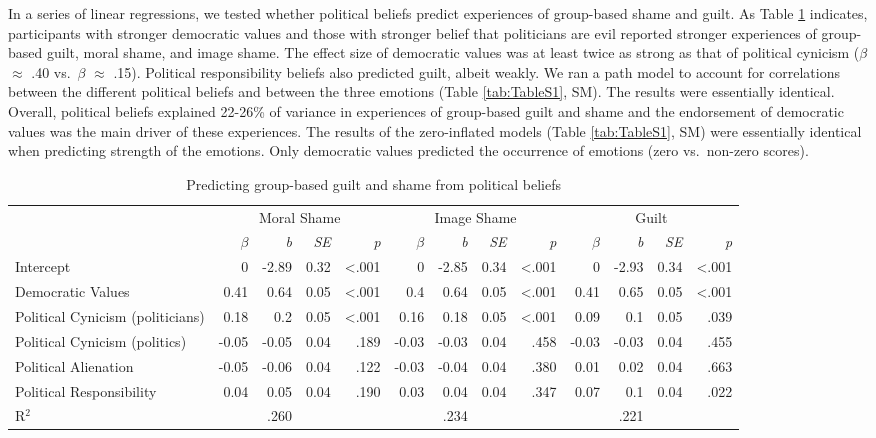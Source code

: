 \documentclass[
]{article}
\begin{document}
In a series of linear regressions, we tested whether political beliefs predict experiences of group-based shame and guilt. As Table \ref{tab:Table1} indicates, participants with stronger democratic values and those with stronger belief that politicians are evil reported stronger experiences of group-based guilt, moral shame, and image shame. The effect size of democratic values was at least twice as strong as that of political cynicism (\(\beta\) \(\approx\) .40 vs.~\(\beta\) \(\approx\) .15). Political responsibility beliefs also predicted guilt, albeit weakly. We ran a path model to account for correlations between the different political beliefs and between the three emotions (Table \ref{tab:TableS1}, SM). The results were essentially identical. Overall, political beliefs explained 22-26\% of variance in experiences of group-based guilt and shame and the endorsement of democratic values was the main driver of these experiences. The results of the zero-inflated models (Table \ref{tab:TableS1}, SM) were essentially identical when predicting strength of the emotions. Only democratic values predicted the occurrence of emotions (zero vs.~non-zero scores).

\begin{table}[H]

\caption{\label{tab:Table1}Predicting group-based guilt and shame from political beliefs}
\centering
\fontsize{8}{10}\selectfont
\begin{tabular}[t]{lrrrrrrrrrrrr}
\toprule
\multicolumn{1}{c}{} & \multicolumn{4}{c}{Moral Shame} & \multicolumn{4}{c}{Image Shame} & \multicolumn{4}{c}{Guilt} \\
\cmidrule(l{3pt}r{3pt}){2-5} \cmidrule(l{3pt}r{3pt}){6-9} \cmidrule(l{3pt}r{3pt}){10-13}
\em{ } & \em{$\beta$} & \em{b} & \em{SE} & \em{p} & \em{$\beta$} & \em{b} & \em{SE} & \em{p} & \em{$\beta$} & \em{b} & \em{SE} & \em{p}\\
\midrule
Intercept & 0 & -2.89 & 0.32 & <.001 & 0 & -2.85 & 0.34 & <.001 & 0 & -2.93 & 0.34 & <.001\\
Democratic Values & 0.41 & 0.64 & 0.05 & <.001 & 0.4 & 0.64 & 0.05 & <.001 & 0.41 & 0.65 & 0.05 & <.001\\
Political Cynicism (politicians) & 0.18 & 0.2 & 0.05 & <.001 & 0.16 & 0.18 & 0.05 & <.001 & 0.09 & 0.1 & 0.05 & .039\\
Political Cynicism (politics) & -0.05 & -0.05 & 0.04 & .189 & -0.03 & -0.03 & 0.04 & .458 & -0.03 & -0.03 & 0.04 & .455\\
Political Alienation & -0.05 & -0.06 & 0.04 & .122 & -0.03 & -0.04 & 0.04 & .380 & 0.01 & 0.02 & 0.04 & .663\\
\addlinespace
Political Responsibility & 0.04 & 0.05 & 0.04 & .190 & 0.03 & 0.04 & 0.04 & .347 & 0.07 & 0.1 & 0.04 & .022\\
\midrule
R$^{2}$ &  & .260 &  &  &  & .234 &  &  &  & .221 &  & \\
\bottomrule
\end{tabular}
\end{table}
\end{document}
